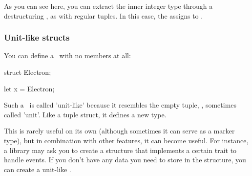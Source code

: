 As you can see here, you can extract the inner integer type through a destructuring \keylet, as with regular tuples. In this case, the 
 assigns  to .

\subsubsection*{Unit-like structs}

You can define a \struct\ with no members at all:

\begin{rustc}
struct Electron;

let x = Electron;
\end{rustc}

Such a \struct\ is called 'unit-like' because it resembles the empty tuple, \code{()}, sometimes called 'unit'. Like a tuple struct, 
it defines a new type.

\blank

This is rarely useful on its own (although sometimes it can serve as a marker type), but in combination with other features, it can 
become useful. For instance, a library may ask you to create a structure that implements a certain trait to handle events. If you 
don't have any data you need to store in the structure, you can create a unit-like \struct.
